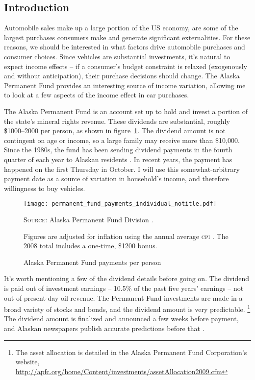 \documentclass[11pt,letterpaper,oneside]{article}
\begin{document}
\begin{doublespacing}
\section{Introduction}

Automobile sales make up a large portion of the US economy, are some of the largest purchases consumers make and generate significant externalities.
For these reasons, we should be interested in what factors drive automobile purchases and consumer choices.
Since vehicles are substantial investments, it's natural to expect income effects -- if a consumer's budget constraint is relaxed (exogenously and without anticipation), their purchase decisions should change.
The  Alaska Permanent Fund provides an interesting source of income variation, allowing me to look at a few aspects of the income effect in car purchases.

The Alaska Permanent Fund is an account set up to hold and invest a portion of the state's mineral rights revenue.
These dividends are substantial, roughly \$1000--2000 per person, as shown in figure~\ref{fig:permanent-fund-payments-individual}.
The dividend amount is not contingent on age or income, so a large family may receive more than \$10,000.
Since the 1980s, the fund has been sending dividend payments in the fourth quarter of each year to Alaskan residents \parencite{hsieh2003}.
In recent years, the payment has happened on the first Thursday in October.
I will use this somewhat-arbitrary payment date as a source of variation in household's income, and therefore willingness to buy vehicles.

\begin{figure}[bht]
    \caption{\large Alaska Permanent Fund payments per person}
    \texttt{[image: permanent\_fund\_payments\_individual\_notitle.pdf]}
    \label{fig:permanent-fund-payments-individual}

\noindent\textsc{Source:} Alaska Permanent Fund Division \parencite{apfd_payments_summary}.\par
		Figures are adjusted for inflation using the annual average \textsc{cpi} \parencite{fred_inflation}.
		The 2008 total includes a one-time, \$1200 bonus.
\end{figure}

It's worth mentioning a few of the dividend details before going on.
The dividend is paid out of investment earnings -- 10.5\% of the past five years' earnings -- not out of present-day oil revenue.
The Permanent Fund investments are made in a broad variety of stocks and bonds, and the dividend amount is very predictable.
\footnote{The asset allocation is detailed in the Alaska Permanent Fund Corporation's website, \url{http://apfc.org/home/Content/investments/assetAllocation2009.cfm}}
The dividend amount is finalized and announced a few weeks before payment, and Alaskan newspapers publish accurate predictions before that \parencite{adn_dividend_prediction, adn_dividend_realization}.


\end{doublespacing}
\end{document}
